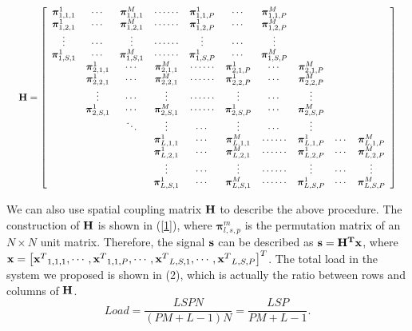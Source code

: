 \documentclass[conference]{IEEEtran}
\begin{document}
\begin{equation}
\resizebox{1\hsize}{!}{
$\bf{H} = \left[ {\begin{array}{*{20}{c}}
{{\bm{\pi }}_{1,1,1}^1}& \cdots &{{\bm{\pi }}_{1,1,1}^M}&{ \cdots  \cdots }&{{\bm{\pi }}_{1,1,P}^1}& \cdots &{{\bm{\pi }}_{1,1,P}^M}&{}&{}&{}\\
{{\bm{\pi }}_{1,2,1}^1}& \cdots &{{\bm{\pi }}_{1,2,1}^M}&{ \cdots  \cdots }&{{\bm{\pi }}_{1,2,P}^1}& \cdots &{{\bm{\pi }}_{1,2,P}^M}&{}&{}&{}\\
 \vdots & \cdots & \vdots &{ \cdots  \cdots }& \vdots & \cdots &\vdots&{}&{}&{}\\
{{\bm{\pi }}_{1,S,1}^1}& \cdots &{{\bm{\pi }}_{1,S,1}^M}&{ \cdots  \cdots }&{{\bm{\pi }}_{1,S,P}^1}& \cdots &{{\bm{\pi }}_{1,S,P}^M}&{}&{}&{}\\
{}&{{\bm{\pi }}_{2,1,1}^1}& \cdots &{{\bm{\pi }}_{2,1,1}^M}&{ \cdots  \cdots }&{{\bm{\pi }}_{2,1,P}^1}& \cdots &{{\bm{\pi }}_{2,1,P}^M}&{}&{}\\
{}&{{\bm{\pi }}_{2,2,1}^1}& \cdots &{{\bm{\pi }}_{2,2,1}^M}&{ \cdots  \cdots }&{{\bm{\pi }}_{2,2,P}^1}& \cdots &{{\bm{\pi }}_{2,2,P}^M}&{}&{}\\
{}& \vdots & \cdots & \vdots &{ \cdots  \cdots }& \vdots & \cdots & \vdots &{}&{}\\
{}&{{\bm{\pi }}_{2,S,1}^1}& \cdots &{{\bm{\pi }}_{2,S,1}^M}&{ \cdots  \cdots }&{{\bm{\pi }}_{2,S,P}^1}& \cdots &{{\bm{\pi }}_{2,S,P}^M}&{}&{}\\
{}&{}& \ddots & \vdots & \cdots & \vdots & \cdots & \vdots &{}&{}\\
{}&{}&{}&{{\bm{\pi }}_{L,1,1}^1}& \cdots &{{\bm{\pi }}_{L,1,1}^M}&{ \cdots  \cdots }&{{\bm{\pi }}_{L,1,P}^1}& \cdots &{{\bm{\pi }}_{L,1,P}^M}\\
{}&{}&{}&{{\bm{\pi }}_{L,2,1}^1}& \cdots &{{\bm{\pi }}_{L,2,1}^M}&{ \cdots  \cdots }&{{\bm{\pi }}_{L,2,P}^1}& \cdots &{{\bm{\pi }}_{L,2,P}^M}\\
{}&{}&{}& \vdots & \cdots & \vdots &{ \cdots  \cdots }& \vdots & \cdots & \vdots \\
{}&{}&{}&{{\bm{\pi }}_{L,S,1}^1}& \cdots &{{\bm{\pi }}_{L,S,1}^M}&{ \cdots  \cdots }&{{\bm{\pi }}_{L,S,P}^1}& \cdots &{{\bm{\pi }}_{L,S,P}^M}
\end{array}} \right]$
}\label{1}
\end{equation}

We can also use spatial coupling matrix $\bf{H}$ to describe the above procedure. The construction of $\bf{H}$ is shown in (\ref{1}), where ${\bm{\pi }}_{l,s,p}^m$ is the permutation matrix of an $N  \times N $ unit matrix. Therefore, the signal $\bf{s}$ can be described as $\bf{s} = {\bf{H}^T}\bf{x}$, where ${\bf{x}} = {\left[ {{{\bf{x}}^T}_{1,1,1}, \cdots ,{{\bf{x}}^T}_{1,1,P}, \cdots ,{{\bf{x}}^T}_{L,S,1}, \cdots ,{{\bf{x}}^T}_{L,S,P}} \right]^T}$.
The total load in the system we proposed is shown in (2), which is actually the ratio between rows and columns of ${\bf{H}}$.
\begin{equation}
Load = \frac{{LSPN}}{{(PM + L - 1)N}} = \frac{{LSP}}{{PM + L - 1}}\label{2}.
\end{equation}
\end{document}
